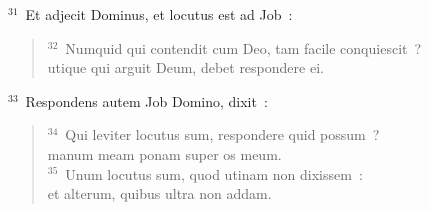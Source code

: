 ${}^{31}$~Et adjecit Dominus, et locutus est ad Job~:
\begin{flushleft}\begin{verse}${}^{32}$~Numquid qui contendit cum Deo, tam facile conquiescit~?\\ utique qui arguit Deum, debet respondere ei.\end{verse}\end{flushleft}


${}^{33}$~Respondens autem Job Domino, dixit~:
\begin{flushleft}\begin{verse}${}^{34}$~Qui leviter locutus sum, respondere quid possum~?\\ manum meam ponam super os meum.\\
${}^{35}$~Unum locutus sum, quod utinam non dixissem~:\\ et alterum, quibus ultra non addam.\end{verse}\end{flushleft}



